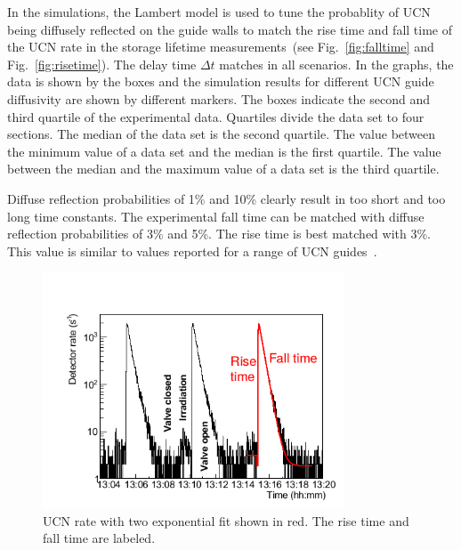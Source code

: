 In the simulations, the Lambert model is used to tune the probablity
of UCN being diffusely reflected on the guide walls to match the rise
time and fall time of the UCN rate in the storage lifetime
measurements~(see Fig.~\ref{fig:falltime} and
Fig.~\ref{fig:risetime}).  The delay time $\Delta t$ matches in all
scenarios.  In the graphs, the data is shown by the boxes and the
simulation results for different UCN guide diffusivity are shown by
different markers. The boxes indicate the second and third quartile of
the experimental data. Quartiles divide the data set to four
sections. The median of the data set is the second quartile. The value
between the minimum value of a data set and the median is the first
quartile. The value between the median and the maximum value of a data
set is the third quartile.

Diffuse reflection probabilities of 1\% and 10\% clearly result in too
short and too long time constants. The experimental fall time can be
matched with diffuse reflection probabilities of 3\% and 5\%. The rise
time is best matched with 3\%. This value is similar to values
reported for a range of UCN
guides~\cite{DAUM201471,Wlokka2017,Atchison2010}.


\begin{figure}[h!]
  \centering
  \includegraphics[width=0.8\textwidth]{risefalltime.png}
  \caption[UCN cycle with a two exponential fit]{UCN rate with two
    exponential fit shown in red. The rise time and fall time are
    labeled.}
  \label{fig:risefalltime}
\end{figure}

